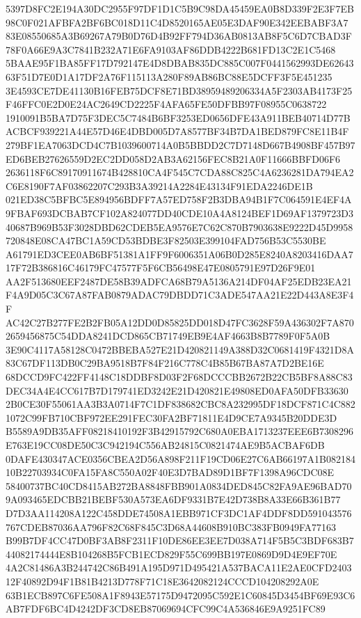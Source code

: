 \documentclass[UTF8,fontset=fandol,zihao=-4,a4paper]{ctexart}
\begin{document}
{{5397D8FC2E194A30DC2955F97DF1D1C5B9C98DA45459EA0B8D339F2E3F7EB98C0F021AFBFA2BF6BC018D11C4D8520165AE05E3DAF90E342EEBABF3A7
83E08550685A3B69267A79B0D76D4B92FF794D36AB0813AB8F5C6D7CBAD3F78F0A66E9A3C7841B232A71E6FA9103AF86DDB4222B681FD13C2E1C5468
5BAAE95F1BA85FF17D792147E4D8DBAB835DC885C007F0441562993DE6264363F51D7E0D1A17DF2A76F115113A280F89AB86BC88E5DCFF3F5E451235
3E4593CE7DE41130B16FEB75DCF8E71BD38959489206334A5F2303AB4173F25F46FFC0E2D0E24AC2649CD2225F4AFA65FE50DFBB97F08955C0638722
1910091B5BA7D75F3DEC5C7484B6BF3253ED0656DFE43A911BEB40714D77BACBCF939221A44E57D46E4DBD005D7A8577BF34B7DA1BED879FC8E11B4F
279BF1EA7063DCD4C7B1039600714A0B5BBDD2C7D7148D667B4908BF457B97ED6BEB27626559D2EC2DD058D2AB3A62156FEC8B21A0F11666BBFD06F6
2636118F6C89170911674B428810CA4F545C7CDA88C825C4A6236281DA794EA2C6E8190F7AF03862207C293B3A39214A2284E43134F91EDA2246DE1B
021ED38C5BFBC5E894956BDFF7A57ED758F2B3DBA94B1F7C064591E4EF4A9FBAF693DCBAB7CF102A824077DD40CDE10A4A8124BEF1D69AF1379723D3
40687B969B53F3028DBD62CDEB5EA9576E7C62C870B7903638E9222D45D9958720848E08CA47BC1A59CD53BDBE3F82503E399104FAD756B53C5530BE
A61791ED3CEE0AB6BF51381A1FF9F6006351A06B0D285E8240A8203416DAA717F72B386816C46179FC47577F5F6CB56498E47E0805791E97D26F9E01
AA2F513680EEF2487DE58B39ADFCA68B79A5136A214DF04AF25EDB23EA21F4A9D05C3C67A87FAB0879ADAC79DBDD71C3ADE547AA21E22D443A8E3F4F
AC42C27B277FE2B2FB05A12DD0D85825DD018D47FC3628F59A436302F7A8702659456875C54DDA8241DCD865CB71749EB9E4AF4663B8B7789F0F5A0B
3E90C4117A58128C0472BBEBA527E21D420821149A388D32C0681419F4321D8A83C67DF113DB0C29BA9518B7F84F216C778C4B85B67BA87A7D2BE16E
68DCCD9FC422FF4148C18DDBF8D03F2F68DCCCBB2672B22CB5BF8A88C83DEC34A4E4CC617B7D179741ED3242E21D420821E49808ED0AFA50DFB33630
2B0CE30F55061AA3B3A0714F7C1DF838682CBC8A232995DF18DCF871C4C8821072C99FB710CBF972EE291FEC30FA2BF71811E4D9CE7A9345B20DDE3D
B5589A9DB35AFF08218410192F3B42915792C680A0EBA1713237EEE6B7308296E763E19CC08DE50C3C942194C556AB24815C0821474AE9B5ACBAF6DB
0DAFE430347ACE0356CBEA2D56A898F211F19CD06E27C6AB66197A1B08218410B22703934C0FA15FA8C550A02F40E3D7BAD89D1BF7F1398A96CDC08E
58400737BC40CD8415AB272BA8848FBB901A0834DED845C82FA9AE96BAD709A093465EDCBB21BEBF530A573EA6DF9331B7E42D738B8A33E66B361B77
D7D3AA114208A122C458DDE74508A1EBB971CF3DC1AF4DDF8DD591043576767CDEB87036AA796F82C68F845C3D68A44608B910BC383FB0949FA77163
B99B7DF4CC47D0BF3AB8F2311F10DE86EE3EE7D038A714F5B5C3BDF683B744082174444E8B104268B5FCB1ECD829F55C699BB197E0869D9D4E9EF70E
4A2C81486A3B244742C86B491A195D971D495421A537BACA11E2AE0CFD240312F40892D94F1B81B4213D778F71C18E3642082124CCCD104208292A0E
63B1ECB897C6FE508A1F8943E57175D9472095C592E1C60845D3454BF69E93C6AB7FDF6BC4D4242DF3CD8EB87069694CFC99C4A536846E9A9251FC89
}}
\end{document}
